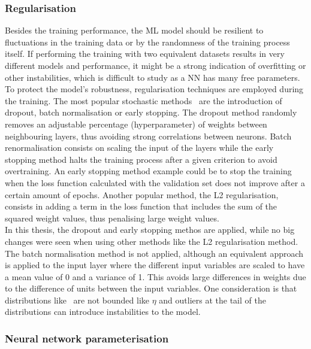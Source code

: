 \subsubsection{Regularisation}

Besides the training performance, the ML model should be resilient to fluctuations in the training data or by the randomness of the training process itself. If performing the training with two equivalent datasets results in very different models and performance, it might be a strong indication of overfitting or other instabilities, which is difficult to study as a NN has many free parameters.\\

To protect the model's robustness, regularisation techniques are employed during the training. The most popular stochastic methods~\cite{JMLR:v15:srivastava14a,batchnorm,earlystop} are the introduction of dropout, batch normalisation or early stopping. The dropout method randomly removes an adjustable percentage (hyperparameter) of weights between neighbouring layers, thus avoiding strong correlations between neurons. Batch renormalisation consists on scaling the input of the layers while the early stopping method halts the training process after a given criterion to avoid overtraining. An early stopping method example could be to stop the training when the loss function calculated with the validation set does not improve after a certain amount of epochs. Another popular method, the L2 regularisation, consists in adding a term in the loss function that includes the sum of the squared weight values, thus penalising large weight values.\\

In this thesis, the dropout and early stopping methos are applied, while no big changes were seen when using other methods like the L2 regularisation method. The batch normalisation method is not applied, although an equivalent approach is applied to the input layer where the different input variables are scaled to have a mean value of 0 and a variance of 1. This avoids large differences in weights due to the difference of units between the input variables. One consideration is that distributions like \pT\ are not bounded like $\eta$ and outliers at the tail of the distributions can introduce instabilities to the model.

\subsubsection{Neural network parameterisation}

